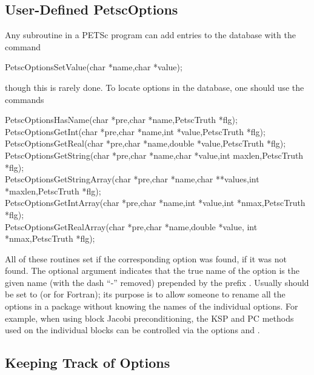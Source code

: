 {{{\subsection{User-Defined PetscOptions}

Any subroutine in a PETSc program can add entries to the database with the 
command 
\begin{tabbing}
  PetscOptionsSetValue(char *name,char *value);
\end{tabbing}
though this is rarely done.
To locate options in the database, one should use the
commands  
\begin{tabbing}
  PetscOptionsHasName(char *pre,char *name,PetscTruth *flg);\\
  PetscOptionsGetInt(char *pre,char *name,int *value,PetscTruth *flg);\\
  PetscOptionsGetReal(char *pre,char *name,double *value,PetscTruth *flg);\\
  PetscOptionsGetString(char *pre,char *name,char *value,int maxlen,PetscTruth *flg);\\
  PetscOptionsGetStringArray(char *pre,char *name,char **values,int *maxlen,PetscTruth *flg);\\
  PetscOptionsGetIntArray(char *pre,char *name,int *value,int *nmax,PetscTruth *flg);\\
  PetscOptionsGetRealArray(char *pre,char *name,double *value, int *nmax,PetscTruth *flg);
\end{tabbing}
All 
of  
these 
routines set  if the corresponding option was found,  if it
was not found.  The optional argument
 indicates that the true name of the option is the given name
(with the dash ``-'' removed) prepended by the prefix .
Usually  should be set to  (or 
for Fortran); its purpose is to
allow someone to rename all the options in a package without knowing
the names of the individual options.  For example, when using block
Jacobi preconditioning, the KSP and PC methods used on the individual
blocks can be controlled via the options  and . 

\subsection{Keeping Track of Options}

}}}
